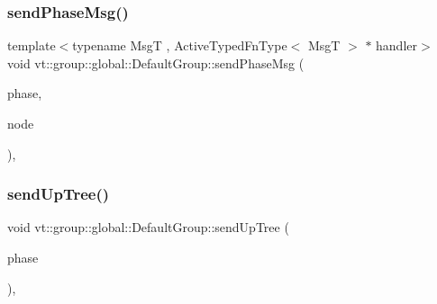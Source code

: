 \subsubsection{\texorpdfstring{send\+Phase\+Msg()}{sendPhaseMsg()}}
{\footnotesize\ttfamily template$<$typename MsgT , Active\+Typed\+Fn\+Type$<$ Msg\+T $>$ $\ast$ handler$>$ \\
void vt\+::group\+::global\+::\+Default\+Group\+::send\+Phase\+Msg (\begin{DoxyParamCaption}\item[{\hyperlink{namespacevt_1_1group_1_1global_a1ad2576a1029e469969bdcd577122ee3}{Phase\+Type} const \&}]{phase,  }\item[{\hyperlink{namespacevt_a866da9d0efc19c0a1ce79e9e492f47e2}{Node\+Type} const \&}]{node }\end{DoxyParamCaption})\hspace{0.3cm}{\ttfamily [static]}, {\ttfamily [private]}}

\mbox{\label{structvt_1_1group_1_1global_1_1_default_group_a92c68a09bfd5d22070c7314667be8e53}} 
\subsubsection{\texorpdfstring{send\+Up\+Tree()}{sendUpTree()}}
{\footnotesize\ttfamily void vt\+::group\+::global\+::\+Default\+Group\+::send\+Up\+Tree (\begin{DoxyParamCaption}\item[{\hyperlink{namespacevt_1_1group_1_1global_a1ad2576a1029e469969bdcd577122ee3}{Phase\+Type} const \&}]{phase }\end{DoxyParamCaption})\hspace{0.3cm}{\ttfamily [static]}, {\ttfamily [private]}}

\mbox{\label{structvt_1_1group_1_1global_1_1_default_group_ab1997e857eafb113b1a96dff3fc46399}} 
